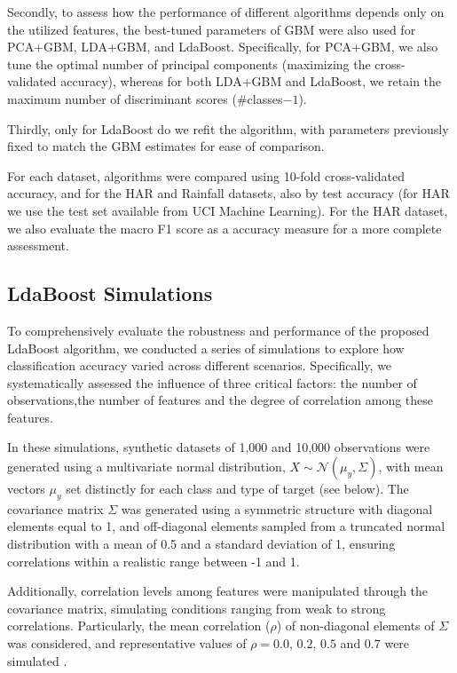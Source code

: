 \documentclass[11pt,a4paper]{article}
\begin{document}
Secondly, to assess how the performance of different algorithms depends only on the utilized features, the best-tuned parameters of GBM were also used for PCA+GBM, LDA+GBM, and LdaBoost. Specifically, for PCA+GBM, we also tune the optimal number of principal components (maximizing the cross-validated accuracy), whereas for both LDA+GBM and LdaBoost, we retain the maximum number of discriminant scores (\#classes$-1$).

Thirdly, only for LdaBoost do we refit the algorithm, with parameters previously fixed to match the GBM estimates for ease of comparison.

For each dataset, algorithms were compared using 10-fold cross-validated accuracy, and for the HAR and Rainfall datasets, also by test accuracy (for HAR we use the test set available from UCI Machine Learning). 
For the HAR dataset, we also evaluate the macro F1 score as a accuracy measure for a more complete assessment.


\subsection*{LdaBoost Simulations}
To comprehensively evaluate the robustness and performance of the proposed LdaBoost algorithm, we conducted a series of simulations to explore how classification accuracy varied across different scenarios. Specifically, we systematically assessed the influence of three critical factors: the number of observations,the number of features and the degree of correlation among these features.

In these simulations, synthetic datasets of 1,000 and 10,000 observations were generated using a multivariate normal distribution, $X \sim \mathcal{N}(\mu_y, \Sigma)$, with mean vectors $\mu_y$ set distinctly for each class and type of target (see below). The covariance matrix $\Sigma$ was generated using a symmetric structure with diagonal elements equal to 1, and off-diagonal elements sampled from a truncated normal distribution with a mean of 0.5 and a standard deviation of 1, ensuring correlations within a realistic range between -1 and 1.

Additionally, correlation levels among features were manipulated through the covariance matrix, simulating conditions ranging from weak to strong correlations. Particularly, the mean correlation ($\rho$) of non-diagonal elements of $\Sigma$ was considered, and representative values of $\rho = 0.0$, $0.2$, $0.5$ and $0.7$ were simulated . 
\end{document}
